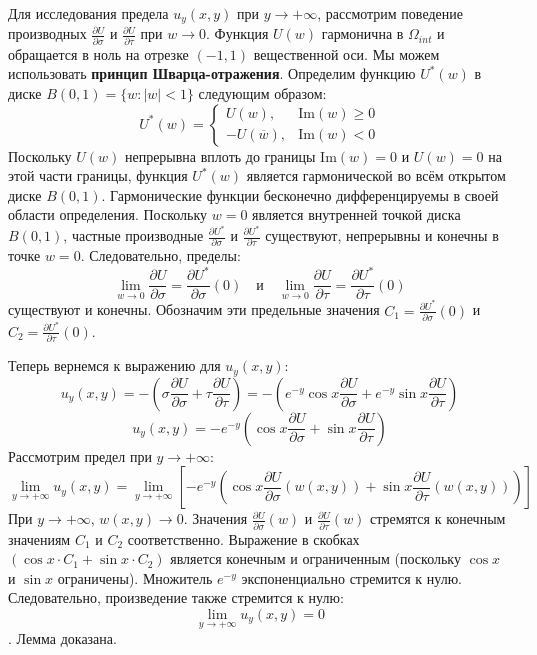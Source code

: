 \documentclass[12pt, a4paper]{article}
\begin{document}
Для исследования предела $u_y(x,y)$ при $y \to +\infty$, рассмотрим поведение производных $\frac{\partial U}{\partial \sigma}$ и $\frac{\partial U}{\partial \tau}$ при $w \to 0$.
Функция $U(w)$ гармонична в $\Omega_{int}$ и обращается в ноль на отрезке $(-1,1)$ вещественной оси. Мы можем использовать \textbf{принцип Шварца-отражения}. Определим функцию $U^*(w)$ в диске $B(0,1) = \{w: |w|<1\}$ следующим образом:
$$ U^*(w) = \begin{cases}
	U(w), & \mathrm{Im}(w) \geq 0 \\
	-U(\overline{w}), & \mathrm{Im}(w) < 0
\end{cases} $$
Поскольку $U(w)$ непрерывна вплоть до границы $\mathrm{Im}(w)=0$ и $U(w)=0$ на этой части границы, функция $U^*(w)$ является гармонической во всём открытом диске $B(0,1)$.
Гармонические функции бесконечно дифференцируемы в своей области определения. Поскольку $w=0$ является внутренней точкой диска $B(0,1)$, частные производные $\frac{\partial U^*}{\partial \sigma}$ и $\frac{\partial U^*}{\partial \tau}$ существуют, непрерывны и конечны в точке $w=0$. Следовательно, пределы:
$$\lim_{w \to 0} \frac{\partial U}{\partial \sigma} = \frac{\partial U^*}{\partial \sigma}(0) \quad \text{и} \quad \lim_{w \to 0} \frac{\partial U}{\partial \tau} = \frac{\partial U^*}{\partial \tau}(0)$$
существуют и конечны. Обозначим эти предельные значения $C_1 = \frac{\partial U^*}{\partial \sigma}(0)$ и $C_2 = \frac{\partial U^*}{\partial \tau}(0)$.

Теперь вернемся к выражению для $u_y(x,y)$:
$$u_y(x,y) = - \left( \sigma \frac{\partial U}{\partial \sigma} + \tau \frac{\partial U}{\partial \tau} \right) = - \left( e^{-y}\cos x \frac{\partial U}{\partial \sigma} + e^{-y}\sin x \frac{\partial U}{\partial \tau} \right)$$
$$u_y(x,y) = - e^{-y} \left( \cos x \frac{\partial U}{\partial \sigma} + \sin x \frac{\partial U}{\partial \tau} \right)$$
Рассмотрим предел при $y \to +\infty$:
$$\lim_{y \to +\infty} u_y(x,y) = \lim_{y \to +\infty} \left[ - e^{-y} \left( \cos x \frac{\partial U}{\partial \sigma}(w(x,y)) + \sin x \frac{\partial U}{\partial \tau}(w(x,y)) \right) \right]$$
При $y \to +\infty$, $w(x,y) \to 0$. Значения $\frac{\partial U}{\partial \sigma}(w)$ и $\frac{\partial U}{\partial \tau}(w)$ стремятся к конечным значениям $C_1$ и $C_2$ соответственно. Выражение в скобках $(\cos x \cdot C_1 + \sin x \cdot C_2)$ является конечным и ограниченным (поскольку $\cos x$ и $\sin x$ ограничены).
Множитель $e^{-y}$ экспоненциально стремится к нулю.
Следовательно, произведение также стремится к нулю:
$$\lim_{y \to +\infty} u_y(x,y) = 0$$. Лемма доказана.
\end{document}
